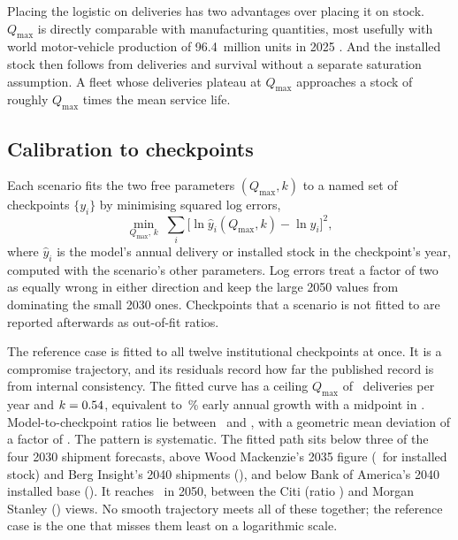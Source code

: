 \documentclass[11pt]{article}
\begin{document}
Placing the logistic on deliveries has two advantages over placing it on stock. $Q_{\max}$ is directly comparable with manufacturing quantities, most usefully with world motor-vehicle production of 96.4~million units in 2025 \citep{oica2026}. And the installed stock then follows from deliveries and survival without a separate saturation assumption. A fleet whose deliveries plateau at $Q_{\max}$ approaches a stock of roughly $Q_{\max}$ times the mean service life.

\subsection{Calibration to checkpoints}\label{sec:calib}
Each scenario fits the two free parameters $(Q_{\max},k)$ to a named set of checkpoints $\{y_i\}$ by minimising squared log errors,
\begin{equation}\label{eq:fit}
\min_{Q_{\max},\,k}\; \sum_i \Big[\ln \hat y_i(Q_{\max},k) - \ln y_i\Big]^2,
\end{equation}
where $\hat y_i$ is the model's annual delivery or installed stock in the checkpoint's year, computed with the scenario's other parameters. Log errors treat a factor of two as equally wrong in either direction and keep the large 2050 values from dominating the small 2030 ones. Checkpoints that a scenario is not fitted to are reported afterwards as out-of-fit ratios.

The reference case is fitted to all twelve institutional checkpoints at once. It is a compromise trajectory, and its residuals record how far the published record is from internal consistency. The fitted curve has a ceiling $Q_{\max}$ of \RefQmax\ deliveries per year and $k=0.54$, equivalent to \Refkpct\,\% early annual growth with a midpoint in \Reftm. Model-to-checkpoint ratios lie between \RefFitMin\ and \RefFitMax, with a geometric mean deviation of a factor of \RefFitGeo. The pattern is systematic. The fitted path sits below three of the four 2030 shipment forecasts, above Wood Mackenzie's 2035 figure (\RefWMSThirtyFive\ for installed stock) and Berg Insight's 2040 shipments (\RefBerg), and below Bank of America's 2040 installed base (\RefBofASForty). It reaches \RefStockFifty\ in 2050, between the Citi (ratio \RefCitiRatio) and Morgan Stanley (\RefMSRatio) views. No smooth trajectory meets all of these together; the reference case is the one that misses them least on a logarithmic scale.
\end{document}
